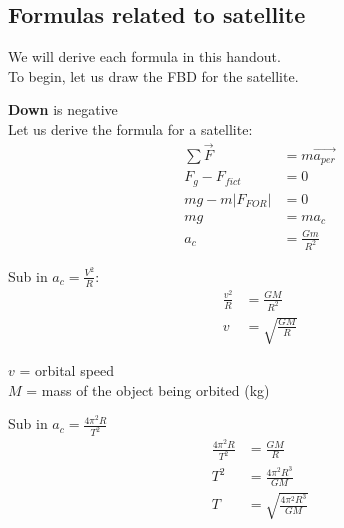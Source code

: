 \subsection{Formulas related to satellite}
We will derive each formula in this handout.\\

To begin, let us draw the FBD for the satellite.\\
\begin{center}
\end{center}

\textbf{Down} is negative\\

Let us derive the formula for a satellite:
\begin{align*}
    \sum \vec{F} &= m\vec{a_{per}}\\
    F_g - F_{fict} &= 0\\
    mg - m\left|F_{FOR}\right| &= 0\\
    mg &= ma_c\\
    a_c &= \frac{Gm}{R^2} 
\end{align*}

Sub in $a_c = \frac{V^2}{R}$:
\begin{align*}
    \frac{v^2}{R} &= \frac{GM}{R^2}\\
    v &= \sqrt{\frac{GM}{R}}
\end{align*}

\begin{center}
    $v$ = orbital speed\\
    $M$ = mass of the object being orbited (kg)
\end{center}

Sub in $a_c = \frac{4\pi^2 R}{T^2}$
\begin{align*}
    \frac{4\pi^2 R}{T^2} &= \frac{GM}{R}\\
    T^2 &= \frac{4\pi^2 R^3}{GM}\\
    T &= \sqrt{\frac{4\pi^2 R^3}{GM}}
\end{align*}
